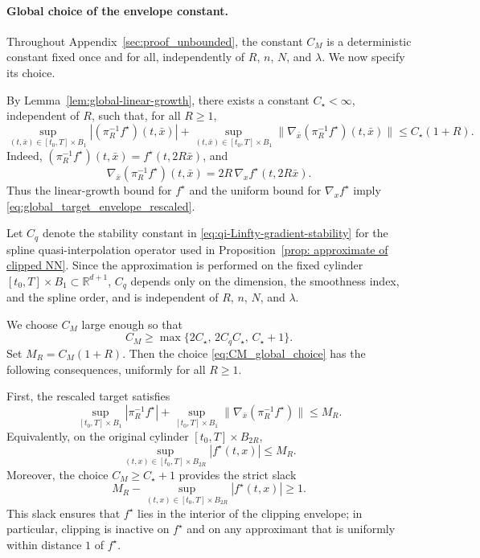 \documentclass[11pt]{article}
\theoremstyle{plain}
\theoremstyle{definition}
\theoremstyle{remark}
\begin{document}
\paragraph{Global choice of the envelope constant.}
Throughout Appendix~\ref{sec:proof_unbounded}, the constant \(C_M\) is a
deterministic constant fixed once and for all, independently of
\(R\), \(n\), \(N\), and \(\lambda\). We now specify its choice.

By Lemma~\ref{lem:global-linear-growth}, there exists a constant
\(C_\star<\infty\), independent of \(R\), such that, for all \(R\ge1\),
\begin{equation}
\label{eq:global_target_envelope_rescaled}
\sup_{(t,\bar x)\in [t_0,T]\times B_1}|(\pi_R^{-1}f^\star)(t,\bar x)|
+
\sup_{(t,\bar x)\in [t_0,T]\times B_1}
\|\nabla_{\bar x}(\pi_R^{-1}f^\star)(t,\bar x)\|
\le
C_\star(1+R).
\end{equation}
Indeed,
\((\pi_R^{-1}f^\star)(t,\bar x)=f^\star(t,2R\bar x)\), and
\[
\nabla_{\bar x}(\pi_R^{-1}f^\star)(t,\bar x)
=
2R\,\nabla_x f^\star(t,2R\bar x).
\]
Thus the linear-growth bound for \(f^\star\) and the uniform bound for
\(\nabla_x f^\star\) imply \eqref{eq:global_target_envelope_rescaled}.

Let \(C_q\) denote the stability constant in
\eqref{eq:qi-Linfty-gradient-stability} for the spline
quasi-interpolation operator used in
Proposition~\ref{prop: approximate of clipped NN}. Since the approximation
is performed on the fixed cylinder \([t_0,T]\times B_1\subset\mathbb R^{d+1}\),
\(C_q\) depends only on the dimension, the smoothness index, and the
spline order, and is independent of \(R\), \(n\), \(N\), and \(\lambda\).

We choose \(C_M\) large enough so that
\begin{equation}
\label{eq:CM_global_choice}
C_M
\ge
\max\big\{
2C_\star,\,
2C_qC_\star,\,
C_\star+1
\big\}.
\end{equation}
Set \(M_R=C_M(1+R)\). Then the choice
\eqref{eq:CM_global_choice} has the following consequences, uniformly for
all \(R\ge1\).

First, the rescaled target satisfies
\begin{equation}
\label{eq:target_envelope_by_MR}
\sup_{[t_0,T]\times B_1}|\pi_R^{-1}f^\star|
+
\sup_{[t_0,T]\times B_1}\|\nabla_{\bar x}(\pi_R^{-1}f^\star)\|
\le M_R.
\end{equation}
Equivalently, on the original cylinder \([t_0,T]\times B_{2R}\),
\[
\sup_{(t,x)\in [t_0,T]\times B_{2R}}|f^\star(t,x)|
\le M_R.
\]
Moreover, the choice \(C_M\ge C_\star+1\) provides the strict slack
\begin{equation}
\label{eq:target_strict_slack}
M_R-\sup_{(t,x)\in [t_0,T]\times B_{2R}}|f^\star(t,x)|
\ge 1.
\end{equation}
This slack ensures that \(f^\star\) lies in the interior of the clipping
envelope; in particular, clipping is inactive on \(f^\star\) and on any
approximant that is uniformly within distance \(1\) of \(f^\star\).
\end{document}
